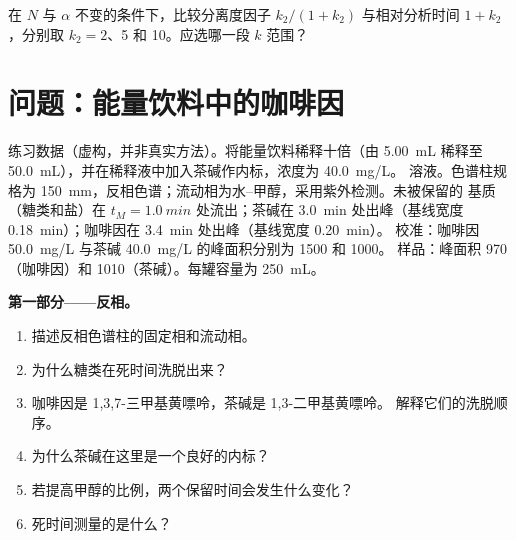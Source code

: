 \begin{exercise}[$\star\star\star$]\label{exo:b2:chromatography:12}
在 $N$ 与 $\alpha$ 不变的条件下，比较分离度因子 $k_2/(1+k_2)$ 与相对分析时间
$1 + k_2$，分别取 $k_2 = 2$、5 和 10。应选哪一段 $k$ 范围？
\end{exercise}

\section{问题：能量饮料中的咖啡因}

\begin{problem}
\label{pb:b2:chromatography:1}
练习数据（虚构，并非真实方法）。将能量饮料稀释十倍（由 \qty{5.00}{mL} 稀释至
\qty{50.0}{mL}），并在稀释液中加入茶碱作内标，浓度为 \qty{40.0}{mg/L}。
溶液。色谱柱规格为 \qty{150}{mm}，反相色谱；流动相为水–甲醇，采用紫外检测。未被保留的
基质（糖类和盐）在 $t_M = \qty{1.0}{min}$ 处流出；茶碱在
\qty{3.0}{min} 处出峰（基线宽度 \qty{0.18}{min}）；咖啡因在 \qty{3.4}{min} 处出峰（基线宽度 \qty{0.20}{min}）。
校准：咖啡因 \qty{50.0}{mg/L} 与茶碱 \qty{40.0}{mg/L} 的峰面积分别为 1500 和 1000。
样品：峰面积 970（咖啡因）和 1010（茶碱）。每罐容量为 \qty{250}{mL}。

\begin{center}
\end{center}

\medskip
\noindent\textbf{第一部分——反相。}
\begin{enumerate}
  \item 描述反相色谱柱的固定相和流动相。
  \item 为什么糖类在死时间洗脱出来？
  \item 咖啡因是 1,3,7-三甲基黄嘌呤，茶碱是 1,3-二甲基黄嘌呤。
        解释它们的洗脱顺序。
  \item 为什么茶碱在这里是一个良好的内标？
  \item 若提高甲醇的比例，两个保留时间会发生什么变化？
  \item 死时间测量的是什么？
\end{enumerate}


\end{problem}
